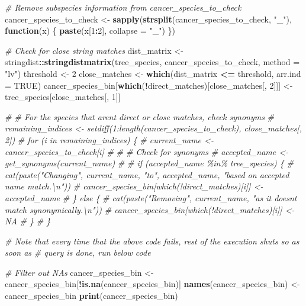 \documentclass[
]{article}
\newenvironment{Shaded}{\begin{snugshade}}{\end{snugshade}}
\newcommand{\AttributeTok}[1]{\textcolor[rgb]{0.13,0.29,0.53}{#1}}
\newcommand{\CommentTok}[1]{\textcolor[rgb]{0.56,0.35,0.01}{\textit{#1}}}
\newcommand{\ConstantTok}[1]{\textcolor[rgb]{0.56,0.35,0.01}{#1}}
\newcommand{\ControlFlowTok}[1]{\textcolor[rgb]{0.13,0.29,0.53}{\textbf{#1}}}
\newcommand{\DecValTok}[1]{\textcolor[rgb]{0.00,0.00,0.81}{#1}}
\newcommand{\FunctionTok}[1]{\textcolor[rgb]{0.13,0.29,0.53}{\textbf{#1}}}
\newcommand{\NormalTok}[1]{#1}
\newcommand{\OtherTok}[1]{\textcolor[rgb]{0.56,0.35,0.01}{#1}}
\newcommand{\SpecialCharTok}[1]{\textcolor[rgb]{0.81,0.36,0.00}{\textbf{#1}}}
\newcommand{\StringTok}[1]{\textcolor[rgb]{0.31,0.60,0.02}{#1}}
\begin{document}
\begin{Shaded}
\begin{Highlighting}[]
\CommentTok{\# Remove subspecies information from cancer\_species\_to\_check}
\NormalTok{cancer\_species\_to\_check }\OtherTok{\textless{}{-}} \FunctionTok{sapply}\NormalTok{(}\FunctionTok{strsplit}\NormalTok{(cancer\_species\_to\_check, }\StringTok{"\_"}\NormalTok{), }\ControlFlowTok{function}\NormalTok{(x) \{}
  \FunctionTok{paste}\NormalTok{(x[}\DecValTok{1}\SpecialCharTok{:}\DecValTok{2}\NormalTok{], }\AttributeTok{collapse =} \StringTok{"\_"}\NormalTok{)}
\NormalTok{\})}


\CommentTok{\# Check for close string matches}
\NormalTok{dist\_matrix }\OtherTok{\textless{}{-}}\NormalTok{ stringdist}\SpecialCharTok{::}\FunctionTok{stringdistmatrix}\NormalTok{(tree\_species, cancer\_species\_to\_check, }\AttributeTok{method =} \StringTok{"lv"}\NormalTok{)}
\NormalTok{threshold }\OtherTok{\textless{}{-}} \DecValTok{2}
\NormalTok{close\_matches }\OtherTok{\textless{}{-}} \FunctionTok{which}\NormalTok{(dist\_matrix }\SpecialCharTok{\textless{}=}\NormalTok{ threshold, }\AttributeTok{arr.ind =} \ConstantTok{TRUE}\NormalTok{)}
\NormalTok{cancer\_species\_bin[}\FunctionTok{which}\NormalTok{(}\SpecialCharTok{!}\NormalTok{direct\_matches)[close\_matches[, }\DecValTok{2}\NormalTok{]]] }\OtherTok{\textless{}{-}}\NormalTok{ tree\_species[close\_matches[, }\DecValTok{1}\NormalTok{]]}

\CommentTok{\# \# For the species that aren\textquotesingle{}t direct or close matches, check synonyms}
\CommentTok{\# remaining\_indices \textless{}{-} setdiff(1:length(cancer\_species\_to\_check), close\_matches[, 2])}
\CommentTok{\# for (i in remaining\_indices) \{}
\CommentTok{\#   current\_name \textless{}{-} cancer\_species\_to\_check[i]}
\CommentTok{\#   }
\CommentTok{\#   \# Check for synonyms}
\CommentTok{\#   accepted\_name \textless{}{-} get\_synonyms(current\_name)}
\CommentTok{\#   }
\CommentTok{\#   if (accepted\_name \%in\% tree\_species) \{}
\CommentTok{\#     cat(paste("Changing", current\_name, "to", accepted\_name, "based on accepted name match.\textbackslash{}n"))}
\CommentTok{\#     cancer\_species\_bin[which(!direct\_matches)[i]] \textless{}{-} accepted\_name}
\CommentTok{\#   \} else \{}
\CommentTok{\#     cat(paste("Removing", current\_name, "as it doesn\textquotesingle{}t match synonymically.\textbackslash{}n"))}
\CommentTok{\#     cancer\_species\_bin[which(!direct\_matches)[i]] \textless{}{-} NA}
\CommentTok{\#   \}}
\CommentTok{\# \}}

\CommentTok{\# Note that every time that the above code fails, rest of the execution shuts so as soon as}
\CommentTok{\# query is done, run below code}

\CommentTok{\# Filter out NAs}
\NormalTok{cancer\_species\_bin }\OtherTok{\textless{}{-}}\NormalTok{ cancer\_species\_bin[}\SpecialCharTok{!}\FunctionTok{is.na}\NormalTok{(cancer\_species\_bin)]}
\FunctionTok{names}\NormalTok{(cancer\_species\_bin) }\OtherTok{\textless{}{-}}\NormalTok{ cancer\_species\_bin}
\FunctionTok{print}\NormalTok{(cancer\_species\_bin)}
\end{Highlighting}
\end{Shaded}
\end{document}
